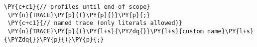  {\footnotesize
 \begin{Verbatim}[commandchars=\\\{\}]
 \PY{c+c1}{// profiles until end of scope}
 \PY{n}{TRACE}\PY{p}{(}\PY{p}{)}\PY{p}{;}
 \PY{c+c1}{// named trace (only literals allowed)}
 \PY{n}{TRACE}\PY{p}{(}\PY{l+s}{\PYZdq{}}\PY{l+s}{custom name}\PY{l+s}{\PYZdq{}}\PY{p}{)}\PY{p}{;}
 \end{Verbatim}
 }
